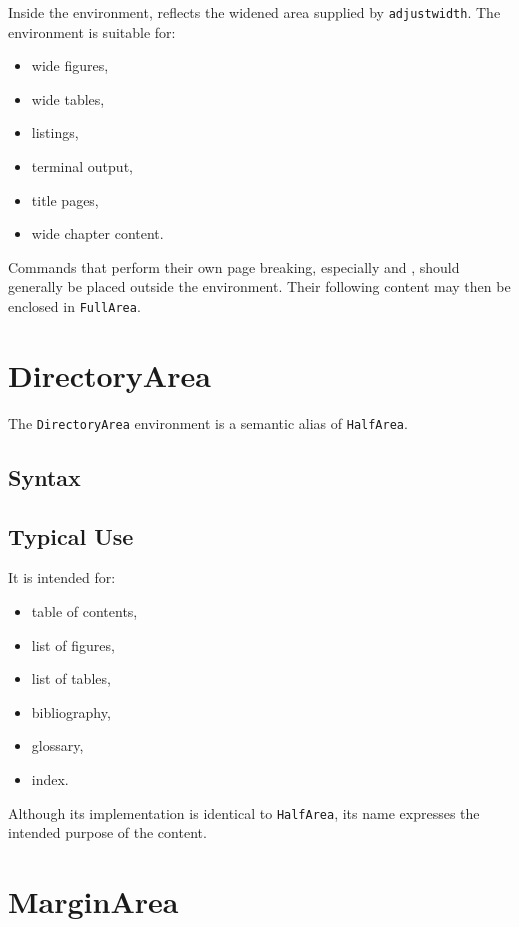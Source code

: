 \documentclass[
11pt,
a4paper,
oneside
]{scrbook}
\begin{document}
Inside the environment,  reflects the widened area supplied
by \texttt{adjustwidth}.
The environment is suitable for:
\begin{itemize}
	\item wide figures,
	\item wide tables,
	\item listings,
	\item terminal output,
	\item title pages,
	\item wide chapter content.
\end{itemize}
Commands that perform their own page breaking, especially  and
, should generally be placed outside the environment.
Their following content may then be enclosed in \texttt{FullArea}.

\section{DirectoryArea}

The \texttt{DirectoryArea} environment is a semantic alias of
\texttt{HalfArea}.

\subsection{Syntax}






\subsection{Typical Use}





It is intended for:
\begin{itemize}
	\item table of contents,
	\item list of figures,
	\item list of tables,
	\item bibliography,
	\item glossary,
	\item index.
\end{itemize}
Although its implementation is identical to \texttt{HalfArea}, its name
expresses the intended purpose of the content.

\section{MarginArea}
\end{document}
